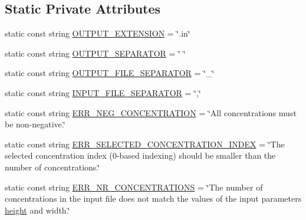 \subsection*{\-Static \-Private \-Attributes}
\begin{DoxyCompactItemize}
\item 
static const string \hyperlink{classmultiscale_1_1video_1_1RectangularCsvToInputFilesConverter_a4a4df22dde1d303c2be63f6f12dd7a8d}{\-O\-U\-T\-P\-U\-T\-\_\-\-E\-X\-T\-E\-N\-S\-I\-O\-N} = \char`\"{}.in\char`\"{}
\item 
static const string \hyperlink{classmultiscale_1_1video_1_1RectangularCsvToInputFilesConverter_a8bc759087441c9d9ec210d30e193cf8a}{\-O\-U\-T\-P\-U\-T\-\_\-\-S\-E\-P\-A\-R\-A\-T\-O\-R} = \char`\"{} \char`\"{}
\item 
static const string \hyperlink{classmultiscale_1_1video_1_1RectangularCsvToInputFilesConverter_a814eefb31383af30a2f79f7518dc9bf8}{\-O\-U\-T\-P\-U\-T\-\_\-\-F\-I\-L\-E\-\_\-\-S\-E\-P\-A\-R\-A\-T\-O\-R} = \char`\"{}\-\_\-\char`\"{}
\item 
static const string \hyperlink{classmultiscale_1_1video_1_1RectangularCsvToInputFilesConverter_a5477635fa0cd7b53fe2bb3a7ae28d2e5}{\-I\-N\-P\-U\-T\-\_\-\-F\-I\-L\-E\-\_\-\-S\-E\-P\-A\-R\-A\-T\-O\-R} = \char`\"{},\char`\"{}
\item 
static const string \hyperlink{classmultiscale_1_1video_1_1RectangularCsvToInputFilesConverter_aec1bb7ad451ff5403d03d5519215efa5}{\-E\-R\-R\-\_\-\-N\-E\-G\-\_\-\-C\-O\-N\-C\-E\-N\-T\-R\-A\-T\-I\-O\-N} = \char`\"{}\-All concentrations must be non-\/negative.\char`\"{}
\item 
static const string \hyperlink{classmultiscale_1_1video_1_1RectangularCsvToInputFilesConverter_af69a7fbe0f633ee22a691089345216c3}{\-E\-R\-R\-\_\-\-S\-E\-L\-E\-C\-T\-E\-D\-\_\-\-C\-O\-N\-C\-E\-N\-T\-R\-A\-T\-I\-O\-N\-\_\-\-I\-N\-D\-E\-X} = \char`\"{}\-The selected concentration index (0-\/based indexing) should be smaller than the number of concentrations.\char`\"{}
\item 
static const string \hyperlink{classmultiscale_1_1video_1_1RectangularCsvToInputFilesConverter_a537517f861e68fc2df30dcb13c3b9a5d}{\-E\-R\-R\-\_\-\-N\-R\-\_\-\-C\-O\-N\-C\-E\-N\-T\-R\-A\-T\-I\-O\-N\-S} = \char`\"{}\-The number of concentrations in the input file does not match the values of the input parameters \hyperlink{classmultiscale_1_1video_1_1RectangularCsvToInputFilesConverter_a766bc7eea1c602f46a4a6c0948464c8a}{height} and width.\char`\"{}
\item 

\end{DoxyCompactItemize}
